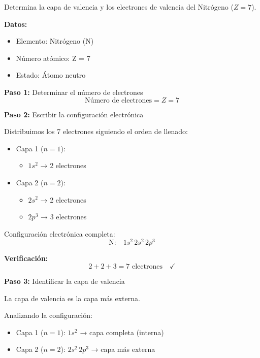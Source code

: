 \begin{exercise}
    Determina la capa de valencia y los electrones de valencia del Nitrógeno (\( Z = 7 \)).
    \begin{solu}
        \textbf{Datos:}
        \begin{itemize}
            \item Elemento: Nitrógeno (N)
            \item Número atómico: Z = 7
            \item Estado: Átomo neutro
        \end{itemize}

        \textbf{Paso 1:} Determinar el número de electrones
        \[
            \text{Número de electrones} = Z = 7
        \]

        \textbf{Paso 2:} Escribir la configuración electrónica

        Distribuimos los 7 electrones siguiendo el orden de llenado:
        \begin{itemize}
            \item Capa 1 (\(n = 1\)):
            \begin{itemize}
                \item \(1s^2\) → 2 electrones
            \end{itemize}
            \item Capa 2 (\(n = 2\)):
            \begin{itemize}
                \item \(2s^2\) → 2 electrones
                \item \(2p^3\) → 3 electrones
            \end{itemize}
        \end{itemize}

        Configuración electrónica completa:
        \[
            \text{N:} \quad 1s^2 \, 2s^2 \, 2p^3
        \]

        \textbf{Verificación:}
        \[
            2 + 2 + 3 = 7 \text{ electrones} \quad \checkmark
        \]

        \textbf{Paso 3:} Identificar la capa de valencia

        La capa de valencia es la capa más externa.

        Analizando la configuración:
        \begin{itemize}
            \item Capa 1 (\(n = 1\)): \(1s^2\) → capa completa (interna)
            \item Capa 2 (\(n = 2\)): \(2s^2 \, 2p^3\) → capa más externa
        \end{itemize}


\end{solu}
\end{exercise}

